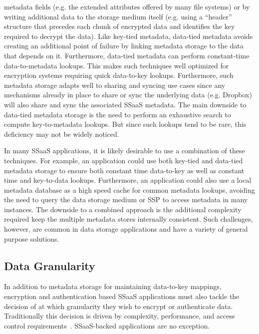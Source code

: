 \begin{packed_desc}
  metadata fields (e.g. the extended attributes offered by many file
  systems) or by writing additional data to the storage medium itself
  (e.g. using a ``header'' structure that precedes each chunk of
  encrypted data and identifies the key required to decrypt the
  data). Like key-tied metadata, data-tied metadata avoids creating an
  additional point of failure by linking metadata storage to the data
  that depends on it. Furthermore, data-tied metadata can perform
  constant-time data-to-metadata lookups. This makes such techniques
  well optimized for encryption systems requiring quick data-to-key
  lookups. Furthermore, such metadata storage adapts well to sharing
  and syncing use cases since any mechanisms already in place to share
  or sync the underlying data (e.g. Dropbox) will also share and sync
  the associated SSaaS metadata. The main downside to data-tied
  metadata storage is the need to perform an exhaustive search to
  compute key-to-metadata lookups. But since such lookups tend to be
  rare, this deficiency may not be widely noticed.
\end{packed_desc}

In many SSaaS applications, it is likely desirable to use a
combination of these techniques. For example, an application could use
both key-tied and data-tied metadata storage to ensure both constant
time data-to-key as well as constant time and key-to-data
lookups. Furthermore, an application could also use a local metadata
database as a high speed cache for common metadata lookups, avoiding
the need to query the data storage medium or SSP to access metadata in
many instances. The downside to a combined approach is the additional
complexity required keep the multiple metadata stores internally
consistent. Such challenges, however, are common in data storage
applications and have a variety of general purpose solutions.

\subsection{Data Granularity}

In addition to metadata storage for maintaining data-to-key mappings,
encryption and authentication based SSaaS applications must also
tackle the decision of at which granularity they wish to encrypt or
authenticate data. Traditionally this decision is driven by
complexity, performance, and access control
requirements~\cite{li2013}.  SSaaS-backed applications are no
exception.


